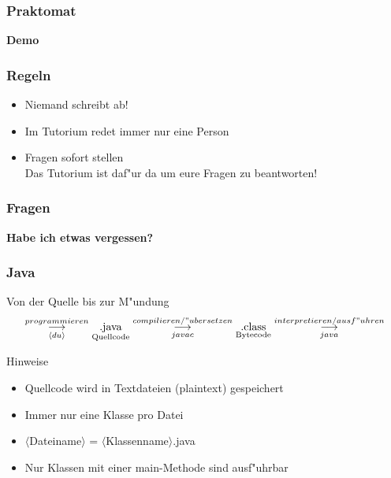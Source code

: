 \documentclass{beamer}
\begin{document}
\begin{frame}
\frametitle{Praktomat}
\begin{center}
\textbf{\Huge Demo}
\end{center}
\end{frame}


\begin{frame}
\frametitle{Regeln}
\begin{block}{}
\begin{itemize}
\item \alert{Niemand schreibt ab!}\pause\\
\item Im Tutorium redet immer nur eine Person\pause\\
\item Fragen sofort stellen\\Das Tutorium ist daf"ur da um eure Fragen zu beantworten!
\end{itemize}
\end{block}
\end{frame}


\begin{frame}
\frametitle{Fragen}
\begin{center}
\textbf{\Huge Habe ich etwas vergessen?}
\end{center}
\end{frame}


\begin{frame}
\frametitle{Java}
\begin{block}{Von der Quelle bis zur M"undung}
$$\overset{programmieren}{\underset{\langle du\rangle}{\longrightarrow}} \underset{\text{Quellcode}}{\text{.java}} \overset{compilieren/"ubersetzen}{\underset{javac}{\longrightarrow}} \underset{\text{Bytecode}}{\text{.class}} \overset{interpretieren/ausf"uhren}{\underset{java}{\longrightarrow}}$$
\end{block}

\pause

\begin{block}{Hinweise}
\begin{itemize}
\item Quellcode wird in Textdateien (plaintext) gespeichert\\
\item Immer nur eine Klasse pro Datei\\
\item $\langle$Dateiname$\rangle$ = $\langle$Klassenname$\rangle$.java\\
\item Nur Klassen mit einer main-Methode sind ausf"uhrbar
\end{itemize}
\end{block}
\end{frame}
\end{document}
